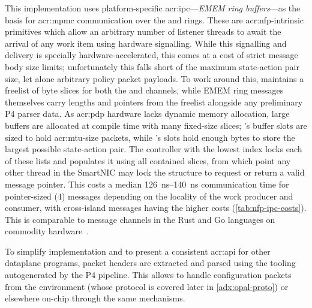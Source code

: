 This implementation uses platform-specific \gls{acr:ipc}---\emph{EMEM ring buffers}---as the basis for \gls{acr:mpmc} communication over the \inring{} and \outring{} rings.
These are \gls{acr:nfp}-intrinsic primitives which allow an arbitrary number of listener threads to await the arrival of any work item using hardware signalling.
While this signalling and delivery is specially hardware-accelerated, this comes at a cost of strict message body size limits; unfortunately this falls short of the maximum state-action pair size, let alone arbitrary policy packet payloads.
To work around this, \approachshort{} maintains a freelist of byte slices for both the \inring{} and \outring{} channels, while EMEM ring messages themselves carry lengths and pointers from the freelist alongside any preliminary P4 parser data.
As \gls{acr:pdp} hardware lacks dynamic memory allocation, large buffers are allocated at compile time with many fixed-size slices; \inring{}'s buffer slots are sized to hold \gls{acr:mtu}-size packets, while \outring{}'s slots hold enough bytes to store the largest possible state-action pair.
The \approachshort{} controller with the lowest index locks each of these lists and populates it using all contained slices, from which point any other thread in the SmartNIC may lock the structure to request or return a valid message pointer.
This costs a median \qtyrange{126}{140}{\nano\second} communication time for pointer-sized (\qty{4}{\byte}) messages depending on the locality of the work producer and consumer, with cross-island messages having the higher costs (\cref{tab:nfp-ipc-costs}).
This is comparable to message channels in the Rust and Go languages on commodity hardware~\parencite{gochans-perf}.

To simplify implementation and to present a consistent \gls{acr:api} for other dataplane programs, packet headers are extracted and parsed using the tooling autogenerated by the P4 pipeline.
This allows \approachshort{} to handle configuration packets from the environment (whose protocol is covered later in \cref{adx:opal-proto}) or elsewhere on-chip through the same mechanisms.


